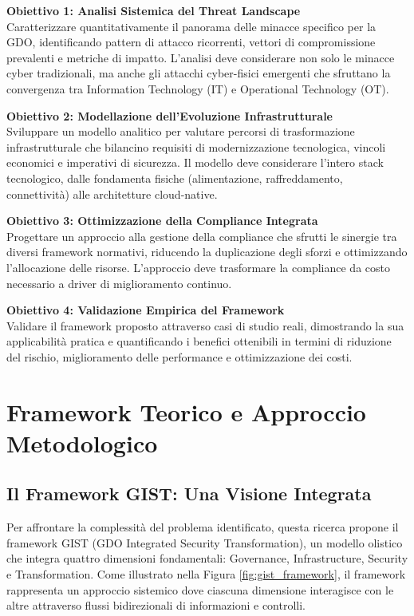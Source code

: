 \textbf{Obiettivo 1: Analisi Sistemica del Threat Landscape}\\
Caratterizzare quantitativamente il panorama delle minacce specifico per la GDO, identificando pattern di attacco ricorrenti, vettori di compromissione prevalenti e metriche di impatto. L'analisi deve considerare non solo le minacce cyber tradizionali, ma anche gli attacchi cyber-fisici emergenti che sfruttano la convergenza tra Information Technology (IT) e Operational Technology (OT).

\textbf{Obiettivo 2: Modellazione dell'Evoluzione Infrastrutturale}\\
Sviluppare un modello analitico per valutare percorsi di trasformazione infrastrutturale che bilancino requisiti di modernizzazione tecnologica, vincoli economici e imperativi di sicurezza. Il modello deve considerare l'intero stack tecnologico, dalle fondamenta fisiche (alimentazione, raffreddamento, connettività) alle architetture cloud-native.

\textbf{Obiettivo 3: Ottimizzazione della Compliance Integrata}\\
Progettare un approccio alla gestione della compliance che sfrutti le sinergie tra diversi framework normativi, riducendo la duplicazione degli sforzi e ottimizzando l'allocazione delle risorse. L'approccio deve trasformare la compliance da costo necessario a driver di miglioramento continuo.

\textbf{Obiettivo 4: Validazione Empirica del Framework}\\
Validare il framework proposto attraverso casi di studio reali, dimostrando la sua applicabilità pratica e quantificando i benefici ottenibili in termini di riduzione del rischio, miglioramento delle performance e ottimizzazione dei costi.

\section{Framework Teorico e Approccio Metodologico}

\subsection{Il Framework GIST: Una Visione Integrata}

Per affrontare la complessità del problema identificato, questa ricerca propone il framework GIST (GDO Integrated Security Transformation), un modello olistico che integra quattro dimensioni fondamentali: Governance, Infrastructure, Security e Transformation. Come illustrato nella Figura \ref{fig:gist_framework}, il framework rappresenta un approccio sistemico dove ciascuna dimensione interagisce con le altre attraverso flussi bidirezionali di informazioni e controlli.


